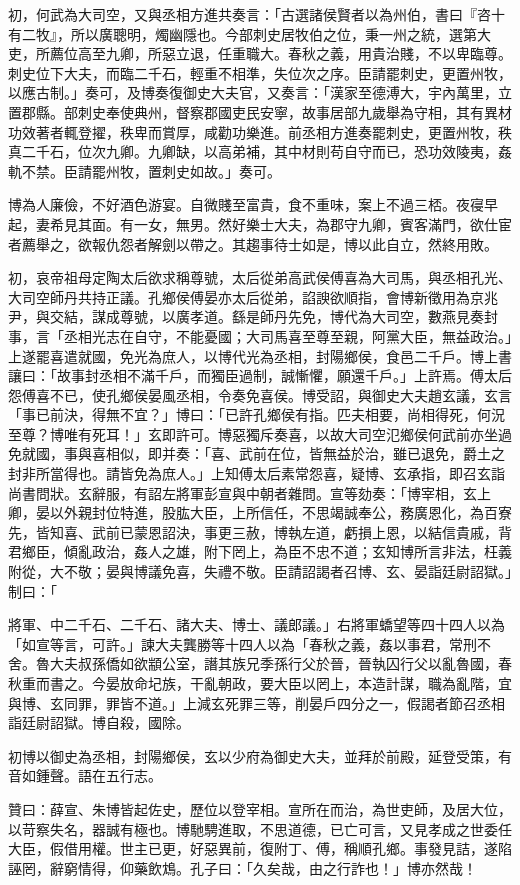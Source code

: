 \begin{pinyinscope}
初，何武為大司空，又與丞相方進共奏言：「古選諸侯賢者以為州伯，書曰『咨十有二牧』，所以廣聰明，燭幽隱也。今部刺史居牧伯之位，秉一州之統，選第大吏，所薦位高至九卿，所惡立退，任重職大。春秋之義，用貴治賤，不以卑臨尊。刺史位下大夫，而臨二千石，輕重不相準，失位次之序。臣請罷刺史，更置州牧，以應古制。」奏可，及博奏復御史大夫官，又奏言：「漢家至德溥大，宇內萬里，立置郡縣。部刺史奉使典州，督察郡國吏民安寧，故事居部九歲舉為守相，其有異材功效著者輒登擢，秩卑而賞厚，咸勸功樂進。前丞相方進奏罷刺史，更置州牧，秩真二千石，位次九卿。九卿缺，以高弟補，其中材則苟自守而已，恐功效陵夷，姦軌不禁。臣請罷州牧，置刺史如故。」奏可。

博為人廉儉，不好酒色游宴。自微賤至富貴，食不重味，案上不過三桮。夜寑早起，妻希見其面。有一女，無男。然好樂士大夫，為郡守九卿，賓客滿門，欲仕宦者薦舉之，欲報仇怨者解劍以帶之。其趨事待士如是，博以此自立，然終用敗。

初，哀帝祖母定陶太后欲求稱尊號，太后從弟高武侯傅喜為大司馬，與丞相孔光、大司空師丹共持正議。孔鄉侯傅晏亦太后從弟，諂諛欲順指，會博新徵用為京兆尹，與交結，謀成尊號，以廣孝道。繇是師丹先免，博代為大司空，數燕見奏封事，言「丞相光志在自守，不能憂國；大司馬喜至尊至親，阿黨大臣，無益政治。」上遂罷喜遣就國，免光為庶人，以博代光為丞相，封陽鄉侯，食邑二千戶。博上書讓曰：「故事封丞相不滿千戶，而獨臣過制，誠慚懼，願還千戶。」上許焉。傅太后怨傅喜不已，使孔鄉侯晏風丞相，令奏免喜侯。博受詔，與御史大夫趙玄議，玄言「事已前決，得無不宜？」博曰：「已許孔鄉侯有指。匹夫相要，尚相得死，何況至尊？博唯有死耳！」玄即許可。博惡獨斥奏喜，以故大司空氾鄉侯何武前亦坐過免就國，事與喜相似，即并奏：「喜、武前在位，皆無益於治，雖已退免，爵土之封非所當得也。請皆免為庶人。」上知傅太后素常怨喜，疑博、玄承指，即召玄詣尚書問狀。玄辭服，有詔左將軍彭宣與中朝者雜問。宣等劾奏：「博宰相，玄上卿，晏以外親封位特進，股肱大臣，上所信任，不思竭誠奉公，務廣恩化，為百寮先，皆知喜、武前已蒙恩詔決，事更三赦，博執左道，虧損上恩，以結信貴戚，背君鄉臣，傾亂政治，姦人之雄，附下罔上，為臣不忠不道；玄知博所言非法，枉義附從，大不敬；晏與博議免喜，失禮不敬。臣請詔謁者召博、玄、晏詣廷尉詔獄。」制曰：「

將軍、中二千石、二千石、諸大夫、博士、議郎議。」右將軍蟜望等四十四人以為「如宣等言，可許。」諫大夫龔勝等十四人以為「春秋之義，姦以事君，常刑不舍。魯大夫叔孫僑如欲顓公室，譖其族兄季孫行父於晉，晉執囚行父以亂魯國，春秋重而書之。今晏放命圮族，干亂朝政，要大臣以罔上，本造計謀，職為亂階，宜與博、玄同罪，罪皆不道。」上減玄死罪三等，削晏戶四分之一，假謁者節召丞相詣廷尉詔獄。博自殺，國除。

初博以御史為丞相，封陽鄉侯，玄以少府為御史大夫，並拜於前殿，延登受策，有音如鍾聲。語在五行志。

贊曰：薛宣、朱博皆起佐史，歷位以登宰相。宣所在而治，為世吏師，及居大位，以苛察失名，器誠有極也。博馳騁進取，不思道德，已亡可言，又見孝成之世委任大臣，假借用權。世主已更，好惡異前，復附丁、傅，稱順孔鄉。事發見詰，遂陷誣罔，辭窮情得，仰藥飲鴆。孔子曰：「久矣哉，由之行詐也！」博亦然哉！


\end{pinyinscope}